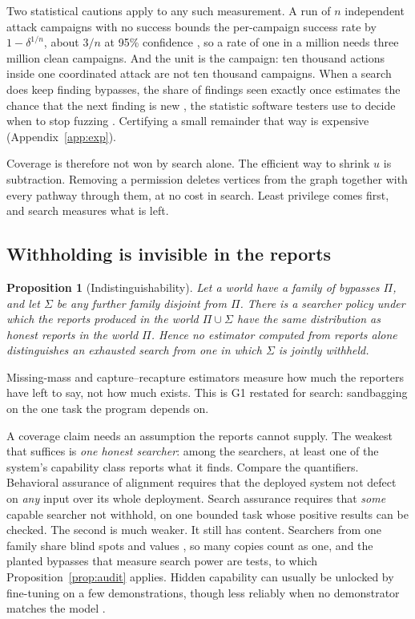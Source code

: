 \documentclass[10pt,twocolumn,letterpaper]{article}
\newtheorem{proposition}{Proposition}
\theoremstyle{definition}
\begin{document}
Two statistical cautions apply to any such measurement. A run of $n$ independent attack campaigns with no success bounds the per-campaign success rate by $1-\delta^{1/n}$, about $3/n$ at 95\% confidence \cite{clopper,hanley}, so a rate of one in a million needs three million clean campaigns. And the unit is the campaign: ten thousand actions inside one coordinated attack are not ten thousand campaigns. When a search does keep finding bypasses, the share of findings seen exactly once estimates the chance that the next finding is new \cite{good,mcallester}, the statistic software testers use to decide when to stop fuzzing \cite{bohme}. Certifying a small remainder that way is expensive (Appendix~\ref{app:exp}).

Coverage is therefore not won by search alone. The efficient way to shrink $u$ is subtraction. Removing a permission deletes vertices from the graph together with every pathway through them, at no cost in search. Least privilege \cite{saltzer} comes first, and search measures what is left.

\subsection{Withholding is invisible in the reports}

\begin{proposition}[Indistinguishability]
\label{prop:withhold}
Let a world have a family of bypasses $\Pi$, and let $\Sigma$ be any further family disjoint from $\Pi$. There is a searcher policy under which the reports produced in the world $\Pi\cup\Sigma$ have the same distribution as honest reports in the world $\Pi$. Hence no estimator computed from reports alone distinguishes an exhausted search from one in which $\Sigma$ is jointly withheld.
\end{proposition}

Missing-mass and capture--recapture estimators measure how much the reporters have left to say, not how much exists. This is G1 restated for search: sandbagging \cite{vanderweij} on the one task the program depends on.

A coverage claim needs an assumption the reports cannot supply. The weakest that suffices is \emph{one honest searcher}: among the searchers, at least one of the system's capability class reports what it finds. Compare the quantifiers. Behavioral assurance of alignment requires that the deployed system not defect on \emph{any} input over its whole deployment. Search assurance requires that \emph{some} capable searcher not withhold, on one bounded task whose positive results can be checked. The second is much weaker. It still has content. Searchers from one family share blind spots and values \cite{lynch,bowkis}, so many copies count as one, and the planted bypasses that measure search power are tests, to which Proposition~\ref{prop:audit} applies. Hidden capability can usually be unlocked by fine-tuning on a few demonstrations, though less reliably when no demonstrator matches the model \cite{password}.
\end{document}

